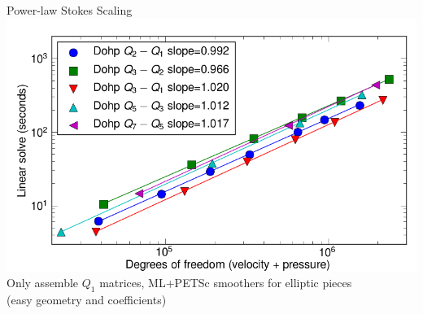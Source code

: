 \begin{frame}{Power-law Stokes Scaling}
  \centering
  \includegraphics[width=\textwidth]{figures/Dohp/Stokes2} \\
  Only assemble $Q_1$ matrices, ML+PETSc smoothers for elliptic pieces \\
  (easy geometry and coefficients)
\end{frame}
